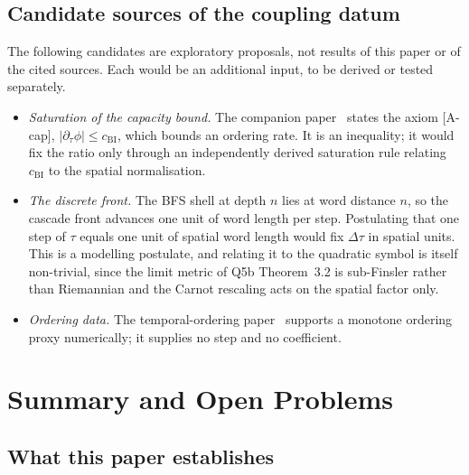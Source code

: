 \documentclass[12pt,a4paper]{article}
\begin{document}
    \subsection{Candidate sources of the coupling datum}

      The following candidates are exploratory proposals, not results of this paper or of the cited sources.
      Each would be an additional input, to be derived or tested separately.

      \begin{itemize}
        \item \emph{Saturation of the capacity bound.}
        The companion paper~\cite{Beau2026c} states the axiom [A-cap], $|\partial_\tau\phi|\le c_{\mathrm{BI}}$, which
        bounds an ordering rate.
        It is an inequality; it would fix the ratio only through an independently derived saturation rule relating
        $c_{\mathrm{BI}}$ to the spatial normalisation.
        \item \emph{The discrete front.}
        The BFS shell at depth $n$ lies at word distance $n$, so the cascade front advances one unit of word length per
        step.
        Postulating that one step of $\tau$ equals one unit of spatial word length would fix $\Delta\tau$ in spatial
        units.
        This is a modelling postulate, and relating it to the quadratic symbol is itself non-trivial, since the limit
        metric of Q5b Theorem~3.2 is sub-Finsler rather than Riemannian and the Carnot rescaling acts on the spatial
        factor only.
        \item \emph{Ordering data.}
        The temporal-ordering paper~\cite{Beau2026pto} supports a monotone ordering proxy numerically; it supplies no
        step and no coefficient.
      \end{itemize}

      \newpage
  \section{Summary and Open Problems}
    \label{sec:summary}

    \subsection{What this paper establishes}
\end{document}

